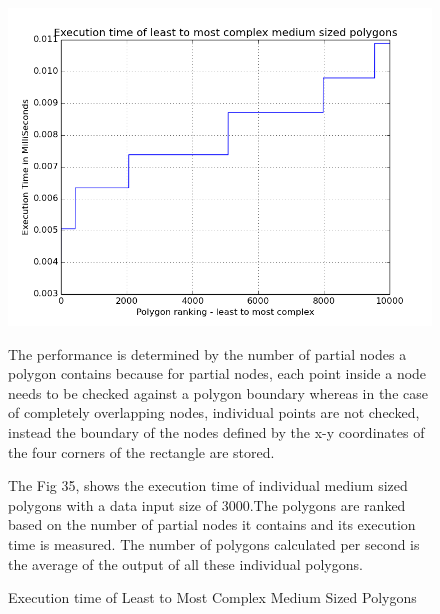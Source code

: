 \documentclass{article}
\begin{document}
\begin{figure}[ht]
\caption{Execution time of Least to Most Complex Medium Sized Polygons}
\includegraphics[scale=0.5]{LToMCmplxMedP}

The performance is determined by the number of partial nodes a polygon contains because for partial nodes, each point inside a node needs to be checked against a polygon boundary whereas in the case of completely overlapping nodes, individual points are not checked, instead the boundary of the nodes defined by the x-y coordinates of the four corners of the rectangle are stored.

The Fig 35, shows the execution time of individual medium sized polygons with a data input size of 3000.The polygons are ranked based on the number of partial nodes it contains and its execution time is measured.
The number of polygons calculated per second is the average of the output of all these individual polygons.

\end{figure}
\end{document}
